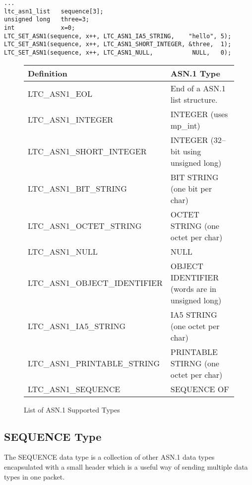 \documentclass[a4paper]{book}
\begin{document}
\begin{small}
\begin{verbatim}
...
ltc_asn1_list   sequence[3];
unsigned long   three=3;
int             x=0;
LTC_SET_ASN1(sequence, x++, LTC_ASN1_IA5_STRING,    "hello", 5);
LTC_SET_ASN1(sequence, x++, LTC_ASN1_SHORT_INTEGER, &three,  1);
LTC_SET_ASN1(sequence, x++, LTC_ASN1_NULL,           NULL,   0);
\end{verbatim}
\end{small}

\begin{figure}[here]
\begin{center}
\begin{small}
\begin{tabular}{|l|l|}
\hline \textbf{Definition}           & \textbf{ASN.1 Type} \\
\hline LTC\_ASN1\_EOL                & End of a ASN.1 list structure. \\
\hline LTC\_ASN1\_INTEGER            & INTEGER (uses mp\_int) \\
\hline LTC\_ASN1\_SHORT\_INTEGER     & INTEGER (32--bit using unsigned long) \\
\hline LTC\_ASN1\_BIT\_STRING        & BIT STRING (one bit per char) \\
\hline LTC\_ASN1\_OCTET\_STRING      & OCTET STRING (one octet per char) \\
\hline LTC\_ASN1\_NULL               & NULL \\
\hline LTC\_ASN1\_OBJECT\_IDENTIFIER & OBJECT IDENTIFIER (words are in unsigned long) \\
\hline LTC\_ASN1\_IA5\_STRING        & IA5 STRING (one octet per char) \\
\hline LTC\_ASN1\_PRINTABLE\_STRING  & PRINTABLE STIRNG (one octet per char) \\
\hline LTC\_ASN1\_SEQUENCE           & SEQUENCE OF \\
\hline
\end{tabular}
\caption{List of ASN.1 Supported Types}
\end{small}
\end{center}
\end{figure}

\subsection{SEQUENCE Type}
The SEQUENCE data type is a collection of other ASN.1 data types encapsulated with a small header which is a useful way of sending multiple data types in one packet.
\end{document}
